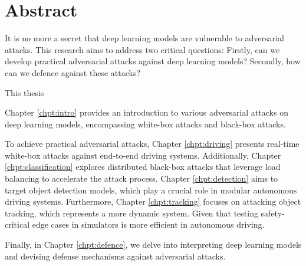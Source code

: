 \chapter*{Abstract}
It is no more a secret that deep learning models are vulnerable to adversarial attacks. This research aims to address two critical questions: Firstly, can we develop practical adversarial attacks against deep learning models? Secondly, how can we defence against these attacks?

This thesis

Chapter \ref{chpt:intro} provides an introduction to various adversarial attacks on deep learning models, encompassing white-box attacks and black-box attacks.

To achieve practical adversarial attacks, Chapter \ref{chpt:driving} presents real-time white-box attacks against end-to-end driving systems. Additionally, Chapter \ref{chpt:classification} explores distributed black-box attacks that leverage load balancing to accelerate the attack process. Chapter \ref{chpt:detection} aims to target object detection models, which play a crucial role in modular autonomous driving systems. Furthermore, Chapter \ref{chpt:tracking} focuses on attacking object tracking, which represents a more dynamic system. Given that testing safety-critical edge cases in simulators is more efficient in autonomous driving.

Finally, in Chapter \ref{chpt:defence}, we delve into interpreting deep learning models and devising defense mechanisms against adversarial attacks.
